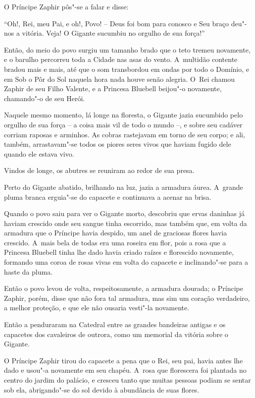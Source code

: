 O Príncipe Zaphir pôs"-se a falar e disse:

``Oh!, Rei, meu Pai, e oh!, Povo! -- Deus foi bom para conosco e Seu
braço deu"-nos a vitória. Veja! O Gigante sucumbiu no orgulho de sua
força!''

Então, do meio do povo surgiu um tamanho brado que o teto tremeu
novamente, e o barulho percorreu toda a Cidade nas asas do vento. A~multidão contente bradou mais e mais, até que o som transbordou em ondas
por todo o Domínio, e em Sob o Pôr do Sol naquela hora nada houve senão
alegria. O~Rei chamou Zaphir de seu Filho Valente, e a Princesa Bluebell
beijou"-o novamente, chamando"-o de seu Herói.

Naquele mesmo momento, lá longe na floresta, o Gigante jazia sucumbido
pelo orgulho de sua força -- a coisa mais vil de todo o mundo --, e
sobre seu cadáver corriam raposas e arminhos. As cobras rastejavam em
torno de seu corpo; e ali, também, arrastavam"-se todos os piores seres
vivos que haviam fugido dele quando ele estava vivo.

Vindos de longe, os abutres se reuniram ao redor de sua presa.

Perto do Gigante abatido, brilhando na luz, jazia a armadura áurea. A~grande pluma branca erguia"-se do capacete e continuava a acenar na
brisa.

Quando o povo saiu para ver o Gigante morto, descobriu que ervas
daninhas já haviam crescido onde seu sangue tinha escorrido, mas também
que, em volta da armadura que o Príncipe havia despido, um anel de
graciosas flores havia crescido. A~mais bela de todas era uma roseira em
flor, pois a rosa que a Princesa Bluebell tinha lhe dado havia criado
raízes e florescido novamente, formando uma coroa de rosas vivas em
volta do capacete e inclinando"-se para a haste da pluma.

Então o povo levou de volta, respeitosamente, a armadura dourada; o
Príncipe Zaphir, porém, disse que não fora tal armadura, mas sim um
coração verdadeiro, a melhor proteção, e que ele não ousaria vesti"-la
novamente.

Então a penduraram na Catedral entre as grandes bandeiras antigas e os
capacetes dos cavaleiros de outrora, como um memorial da vitória sobre o
Gigante.

O Príncipe Zaphir tirou do capacete a pena que o Rei, seu pai, havia
antes lhe dado e usou"-a novamente em seu chapéu. A~rosa que florescera
foi plantada no centro do jardim do palácio, e cresceu tanto que muitas
pessoas podiam se sentar sob ela, abrigando"-se do sol devido à abundância de
suas flores.


